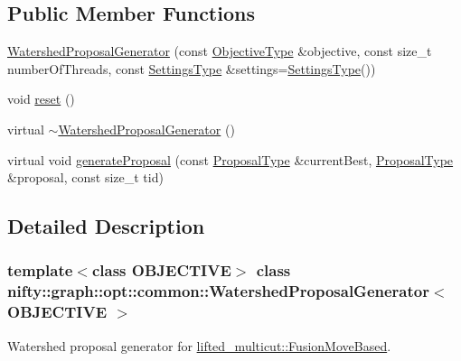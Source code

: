 \subsection*{Public Member Functions}
\begin{DoxyCompactItemize}
\item 
\hyperlink{classnifty_1_1graph_1_1opt_1_1common_1_1WatershedProposalGenerator_a8bf28bcf418e0de0789e1f64fccda671}{Watershed\+Proposal\+Generator} (const \hyperlink{classnifty_1_1graph_1_1opt_1_1common_1_1WatershedProposalGenerator_a00f7d66acd5c7510f38ba3866f9644ff}{Objective\+Type} \&objective, const size\+\_\+t number\+Of\+Threads, const \hyperlink{structnifty_1_1graph_1_1opt_1_1common_1_1WatershedProposalGenerator_1_1SettingsType}{Settings\+Type} \&settings=\hyperlink{structnifty_1_1graph_1_1opt_1_1common_1_1WatershedProposalGenerator_1_1SettingsType}{Settings\+Type}())
\item 
void \hyperlink{classnifty_1_1graph_1_1opt_1_1common_1_1WatershedProposalGenerator_a93174a3bd752d4c2cf2a3eabce5d740c}{reset} ()
\item 
virtual \hyperlink{classnifty_1_1graph_1_1opt_1_1common_1_1WatershedProposalGenerator_aa64defb3bc6b8b7ab1b5e6f409d07b16}{$\sim$\+Watershed\+Proposal\+Generator} ()
\item 
virtual void \hyperlink{classnifty_1_1graph_1_1opt_1_1common_1_1WatershedProposalGenerator_a0dadaa8e06ec15ac6e892ecc2fa6ad97}{generate\+Proposal} (const \hyperlink{classnifty_1_1graph_1_1opt_1_1common_1_1ProposalGeneratorBase_a122993da5c326628cdb865a6279d20c5}{Proposal\+Type} \&current\+Best, \hyperlink{classnifty_1_1graph_1_1opt_1_1common_1_1ProposalGeneratorBase_a122993da5c326628cdb865a6279d20c5}{Proposal\+Type} \&proposal, const size\+\_\+t tid)
\end{DoxyCompactItemize}


\subsection{Detailed Description}
\subsubsection*{template$<$class O\+B\+J\+E\+C\+T\+I\+VE$>$\newline
class nifty\+::graph\+::opt\+::common\+::\+Watershed\+Proposal\+Generator$<$ O\+B\+J\+E\+C\+T\+I\+V\+E $>$}

Watershed proposal generator for \hyperlink{classnifty_1_1graph_1_1opt_1_1lifted__multicut_1_1FusionMoveBased}{lifted\+\_\+multicut\+::\+Fusion\+Move\+Based}. 


